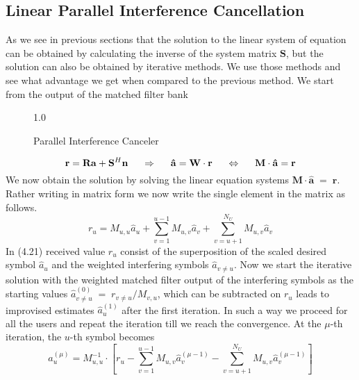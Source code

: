\subsection{Linear Parallel Interference Cancellation}
As we see in previous sections that the solution to the linear system of equation can be obtained by calculating the inverse of the system matrix $\mathrm{\mathbf{S}}$, but the solution can also be obtained by iterative methods. We use those methods and see what advantage we get when compared to the previous method. We start from the output of the matched filter bank
\begin{figure}[htb]
\centerline{  {1.0} }
\caption{Parallel Interference Canceler}
\end{figure}
\begin{equation}
\mathrm{\mathbf{r}}=\mathrm{\mathbf{R}}\mathrm{\mathbf{a}}+\mathrm{\mathbf{S}}^H\mathrm{\mathbf{n}}\hspace{5mm}\Rightarrow\hspace{5mm}\mathrm{\mathbf{\hat{a}}}=\mathrm{\mathbf{W}}\cdot\mathrm{\mathbf{r}}\hspace{5mm}\Leftrightarrow\hspace{5mm}\mathrm{\mathbf{M}}\cdot\mathrm{\mathbf{\hat{a}}}=\mathrm{\mathbf{r}}
\end{equation}
We now obtain the solution by solving the linear equation systems $\mathrm{\mathbf{M}}\cdot\mathrm{\mathbf{\hat{a}}}\;=\;\mathrm{\mathbf{r}}$. Rather writing in matrix form we now write the single element in the matrix as follows.
\begin{equation}
r_u=M_{u,u}\hat{a}_u+\sum\limits_{v=1}^{u-1}M_{u,v}\hat{a}_v+\sum\limits_{v=u+1}^{N_U}M_{u,v}\hat{a}_v
\end{equation}
In (4.21) received value $r_u$ consist of the superposition of the scaled desired symbol $\hat{a}_u$ and the weighted interfering symbols $\hat{a}_{v\ne u}$. Now we start the iterative solution with the weighted matched filter output of the interfering symbols as the starting values $\hat{a}^{(0)}_{v\ne u}\;=\;r_{v\ne u}/M_{v,u}$, which can be subtracted on $r_u$ leads to improvised estimates $\hat{a}_u^{(1)}$ after the first iteration. In such a way we proceed for all the users and repeat the iteration till we reach the convergence. At the $\mu$-th iteration, the $u$-th symbol becomes
\begin{equation}
\hat{a}_u^{(\mu)}=M_{u,u}^{-1}\cdot\left[r_u-\sum\limits_{v=1}^{u-1}M_{u,v}\hat{a}_v^{(\mu-1)}-\sum\limits_{v=u+1}^{N_U}M_{u,v}\hat{a}_v^{(\mu-1)}\right]
\end{equation}
